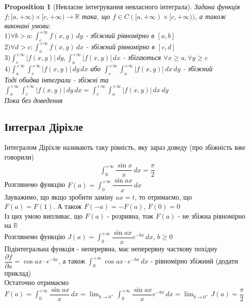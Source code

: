 \documentclass[a4paper, 10pt]{article}
\def\departial#1#2{\dfrac{\partial {#1}}{\partial {#2}}}
\def\huge{\displaystyle}
\theoremstyle{theoremdd}
\theoremstyle{theoremdd}
\theoremstyle{theoremdd}
\theoremstyle{theoremdd}
\theoremstyle{theoremdd}
\newtheorem{proposition}[theorem]{Proposition}
\theoremstyle{theoremdd}
\theoremstyle{theoremdd}
\theoremstyle{theoremdd}
\begin{document}
\begin{proposition}[Невласне інтегрування невласного інтеграла]
Задана функція $f: [a, +\infty) \times [c, +\infty) \to \mathbb{R}$ така, що $f \in C([a, +\infty) \times [c, +\infty))$, а також виконані умови:\\
$1) \forall b > a: \huge \int_c^{+\infty} f(x,y)\,dy$ - збіжний рівномірно в $[a,b]$\\
$2) \forall d > c: \huge \int_a^{+\infty} f(x,y)\,dx$ - збіжний рівномірно в $[c,d]$\\
$3) \huge \int_c^{+\infty} |f(x,y)|\,dy, \huge \int_a^{+\infty} |f(x,y)|\,dx$ - збігаються $\forall x \geq a, \forall y \geq c$\\
$4) \huge \int_a^{+\infty} \int_c^{+\infty} |f(x,y)|\,dy\,dx$ або $\huge \int_c^{+\infty} \int_a^{+\infty} |f(x,y)|\,dx\,dy$ - збіжний\\
Тоді обидва інтеграли - збіжні та \\ $\huge \int_a^{+\infty} \int_c^{+\infty} |f(x,y)|\,dy\,dx  = \huge \int_c^{+\infty} \int_a^{+\infty} |f(x,y)|\,dx\,dy$\\
\textit{Поки без доведення}
\end{proposition}

\subsection{Інтеграл Діріхле}
Інтегралом Діріхле називають таку рівність, яку зараз доведу (про збіжність вже говорили)
\begin{align*}
\int_0^{+\infty} \dfrac{\sin x}{x}\,dx = \dfrac{\pi}{2}
\end{align*}
Розглянемо функцію $F(a) = \huge \int_0^{+\infty} \dfrac{\sin ax}{x}\,dx$\\
Зауважимо, що якщо зробити заміну $ax =t$, то отримаємо, що \\ $F(a) = F(1)$. А також $F(-a) = -F(a)$, $F(0)=0$\\
Із цих умою випливає, що $F(a)$ - розривна, тож $F(a)$ - не збіжна рівномірно на $\mathbb{R}$\\
Розглянемо функцію $J(a) = \huge \int_0^{+\infty} \dfrac{\sin ax}{x} e^{-bx}\,dx$, $b \geq 0$\\
Підінтегральна функція - неперервна, має неперервну часткову похідну $\departial{f}{a} = \cos ax \cdot e^{-bx}$, а також $\huge \int_0^{+\infty} \cos ax \cdot e^{-bx}\,dx$ - рівномірно збіжний (додати приклад)\\
Остаточно отримаємо\\
$F(a) = \huge \int_0^{+\infty} \dfrac{\sin ax}{x}\,dx = \lim_{b \to 0^+} \int_0^{+\infty} \dfrac{\sin ax}{x} e^{-bx}\,dx = \lim_{b \to 0^+} J(a) = \dfrac{\pi}{2}$
\end{document}
